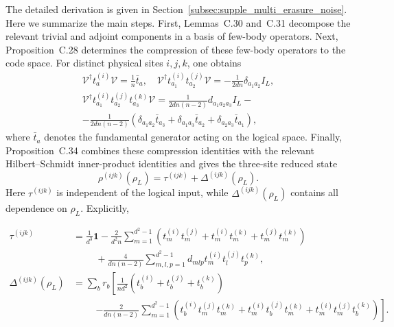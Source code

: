 \documentclass[10pt,twocolumn,superscriptaddress,aps,amsmath,amssymb,citeautoscript,floatfix,prx]{revtex4-2}
\theoremstyle{plain}
\theoremstyle{plain}
\theoremstyle{plain}
\theoremstyle{plain}
\theoremstyle{plain}
\theoremstyle{plain}
\theoremstyle{plain}
\theoremstyle{definition}
\theoremstyle{plain}
\begin{document}
The detailed derivation is given in Section~\ref{subsec:supple_multi_erasure_noise}. Here we summarize the main steps. 
First, Lemmas~C.30 and~C.31 decompose the relevant trivial and adjoint components in a basis of few-body operators. 
Next, Proposition~C.28 determines the compression of these few-body operators to the code space. For distinct physical sites $i,j,k$, one obtains
$$
\begin{gathered}
\mathcal{V}^{\dagger} t_a^{(i)} \mathcal{V}=\frac{1}{n} \bar{t}_a, \quad \mathcal{V}^{\dagger} t_{a_1}^{(i)} t_{a_2}^{(j)} \mathcal{V}=-\frac{1}{2 d n} \delta_{a_1 a_2} I_L, \\
\mathcal{V}^{\dagger} t_{a_1}^{(i)} t_{a_2}^{(j)} t_{a_3}^{(k)} \mathcal{V}=\frac{1}{2 d n(n-2)} d_{a_1 a_2 a_3} I_L-\\-\frac{1}{2 d n(n-2)}\left(\delta_{a_1 a_2} \bar{t}_{a_3}+\delta_{a_1 a_3} \bar{t}_{a_2}+\delta_{a_2 a_3} \bar{t}_{a_1}\right),
\end{gathered}
$$
where $\bar t_a$ denotes the fundamental generator acting on the logical space. 
Finally, Proposition~C.34 combines these compression identities with the relevant Hilbert--Schmidt inner-product identities and gives the three-site reduced state
\begin{equation}\label{eq:3q_reduced_state}
    \rho^{(ijk)}(\rho_L)
    =
    \tau^{(ijk)}
    +
    \Delta^{(ijk)}(\rho_L).
\end{equation}
Here $\tau^{(ijk)}$ is independent of the logical input, while $\Delta^{(ijk)}(\rho_L)$ contains all dependence on $\rho_L$. Explicitly,
\begin{widetext}
\begin{align}
\tau^{(ijk)}
&=
\frac{1}{d^3}\mathbf 1
-\frac{2}{d^2 n}
\sum_{m=1}^{d^2-1}
\left(
t_m^{(i)}t_m^{(j)}
+t_m^{(i)}t_m^{(k)}
+t_m^{(j)}t_m^{(k)}
\right)
\nonumber\\
&\hspace{1cm}
+\frac{4}{dn(n-2)}
\sum_{m,l,p=1}^{d^2-1}
d_{mlp}
t_m^{(i)}t_l^{(j)}t_p^{(k)},
\\
\Delta^{(ijk)}(\rho_L)
&=
\sum_b r_b
\left[
\frac{1}{nd^2}
\left(
t_b^{(i)}
+t_b^{(j)}
+t_b^{(k)}
\right)
\right.
\nonumber\\
&\hspace{1cm}
\left.
-\frac{2}{dn(n-2)}
\sum_{m=1}^{d^2-1}
\left(
t_b^{(i)}t_m^{(j)}t_m^{(k)}
+t_m^{(i)}t_b^{(j)}t_m^{(k)}
+t_m^{(i)}t_m^{(j)}t_b^{(k)}
\right)
\right].
\end{align}
\end{widetext}
\end{document}
